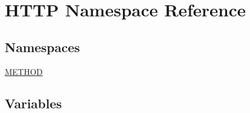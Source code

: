 \hypertarget{namespace_h_t_t_p}{}\section{H\+T\+TP Namespace Reference}
\label{namespace_h_t_t_p}
\subsection*{Namespaces}
\begin{DoxyCompactItemize}
\item 
 \hyperlink{namespace_h_t_t_p_1_1_m_e_t_h_o_d}{M\+E\+T\+H\+OD}
\end{DoxyCompactItemize}
\subsection*{Variables}
